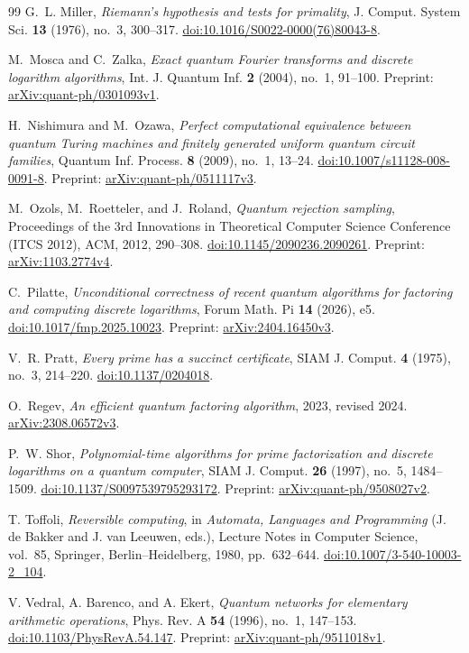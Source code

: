 \begin{thebibliography}{99}
G.~L. Miller,
\emph{Riemann's hypothesis and tests for primality},
J. Comput. System Sci. \textbf{13} (1976), no.~3, 300--317.
\href{https://doi.org/10.1016/S0022-0000(76)80043-8}{doi:10.1016/S0022-0000(76)80043-8}.

M.~Mosca and C.~Zalka,
\emph{Exact quantum Fourier transforms and discrete logarithm algorithms},
Int. J. Quantum Inf. \textbf{2} (2004), no.~1, 91--100.
Preprint: \href{https://arxiv.org/abs/quant-ph/0301093v1}{arXiv:quant-ph/0301093v1}.

H.~Nishimura and M.~Ozawa,
\emph{Perfect computational equivalence between quantum Turing machines
and finitely generated uniform quantum circuit families},
Quantum Inf. Process. \textbf{8} (2009), no.~1, 13--24.
\href{https://doi.org/10.1007/s11128-008-0091-8}{doi:10.1007/s11128-008-0091-8}.
Preprint: \href{https://arxiv.org/abs/quant-ph/0511117v3}{arXiv:quant-ph/0511117v3}.

M.~Ozols, M.~Roetteler, and J.~Roland,
\emph{Quantum rejection sampling},
Proceedings of the 3rd Innovations in Theoretical Computer Science
Conference (ITCS 2012), ACM, 2012, 290--308.
\href{https://doi.org/10.1145/2090236.2090261}{doi:10.1145/2090236.2090261}.
Preprint: \href{https://arxiv.org/abs/1103.2774v4}{arXiv:1103.2774v4}.

C.~Pilatte,
\emph{Unconditional correctness of recent quantum algorithms for factoring
and computing discrete logarithms},
Forum Math. Pi \textbf{14} (2026), e5.
\href{https://doi.org/10.1017/fmp.2025.10023}{doi:10.1017/fmp.2025.10023}.
Preprint: \href{https://arxiv.org/abs/2404.16450v3}{arXiv:2404.16450v3}.

V.~R. Pratt,
\emph{Every prime has a succinct certificate},
SIAM J. Comput. \textbf{4} (1975), no.~3, 214--220.
\href{https://doi.org/10.1137/0204018}{doi:10.1137/0204018}.

O.~Regev,
\emph{An efficient quantum factoring algorithm},
2023, revised 2024.
\href{https://arxiv.org/abs/2308.06572v3}{arXiv:2308.06572v3}.

P.~W. Shor,
\emph{Polynomial-time algorithms for prime factorization and discrete
logarithms on a quantum computer},
SIAM J. Comput. \textbf{26} (1997), no.~5, 1484--1509.
\href{https://doi.org/10.1137/S0097539795293172}{doi:10.1137/S0097539795293172}.
Preprint: \href{https://arxiv.org/abs/quant-ph/9508027v2}{arXiv:quant-ph/9508027v2}.

T. Toffoli,
\emph{Reversible computing},
in \emph{Automata, Languages and Programming}
(J. de Bakker and J. van Leeuwen, eds.),
Lecture Notes in Computer Science, vol.~85,
Springer, Berlin--Heidelberg, 1980, pp.~632--644.
\href{https://doi.org/10.1007/3-540-10003-2_104}{doi:10.1007/3-540-10003-2\_104}.

V. Vedral, A. Barenco, and A. Ekert,
\emph{Quantum networks for elementary arithmetic operations},
Phys. Rev. A \textbf{54} (1996), no.~1, 147--153.
\href{https://doi.org/10.1103/PhysRevA.54.147}{doi:10.1103/PhysRevA.54.147}.
Preprint: \href{https://arxiv.org/abs/quant-ph/9511018v1}{arXiv:quant-ph/9511018v1}.

\end{thebibliography}
